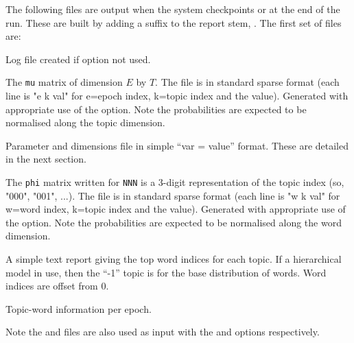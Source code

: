 \documentclass[a4paper,english]{article}
\begin{document}
The following files are output when the system checkpoints 
or at the end of the run.
These are built by adding a suffix to the report stem,
.
The first set of files are:
\begin{Description}\setlength{\itemsep}{0cm}
\item[\File{RepStem.log}] Log file created if  option not used.
\item[\File{RepStem.mu}] The \texttt{mu} matrix of dimension
$E$ by $T$.
The file is in standard sparse format
(each line is "e k val" for e=epoch index, k=topic index
and the value).
Generated with appropriate use of the
 option.
Note the probabilities are expected to be normalised along the topic dimension.
\item[\File{RepStem.par}] Parameter and dimensions file in simple ``var = value'' format.  These are detailed in the next section.
\item[\File{RepStem.phiNNN}] The \texttt{phi} matrix written 
for \texttt{NNN} is a 3-digit representation of the topic index
(so, "000", "001", ...).
The file is in standard sparse format
(each line is "w k val" for w=word index, k=topic index
and the value).
Generated with appropriate use of the
 option.
Note the probabilities are expected to be normalised along the word dimension.
\item[\File{RepStem.top}] A simple text report giving the top word indices
  for each topic.  If a hierarchical model in use, then the
``-1'' topic is for the base distribution of words.
Word indices are offset from 0.
\item[\File{RepStem.tpk}] Topic-word information per epoch.
\end{Description}
Note the  and  files are also used
as input with the  and  options
respectively.
\end{document}
